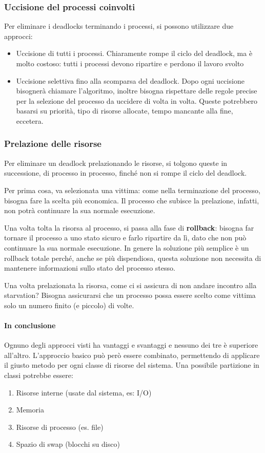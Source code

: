 \documentclass[a4paper]{article}
\begin{document}
\subsubsection{Uccisione del processi coinvolti}
Per eliminare i deadlocks terminando i processi, si possono utilizzare due approcci:
\begin{itemize}
    \item Uccisione di tutti i processi. Chiaramente rompe il ciclo del deadlock, ma è molto costoso: tutti i processi devono ripartire e perdono il lavoro svolto
    \item Uccisione selettiva fino alla scomparsa del deadlock. Dopo ogni uccisione bisognerà chiamare l'algoritmo, inoltre bisogna rispettare delle regole precise per la selezione del processo da uccidere di volta in volta. Queste potrebbero basarsi su priorità, tipo di risorse allocate, tempo mancante  alla fine, eccetera.
\end{itemize}

\subsubsection{Prelazione delle risorse}
Per eliminare un deadlock prelazionando le risorse, si tolgono queste in successione, di processo in processo, finché non si rompe il ciclo del deadlock.

Per prima cosa, va selezionata una vittima: come nella terminazione del processo, bisogna fare la scelta più economica. Il processo che subisce la prelazione, infatti, non potrà continuare la sua normale esecuzione.

Una volta tolta la risorsa al processo, si passa alla fase di \textbf{rollback}: bisogna far tornare il processo a uno stato sicuro e farlo ripartire da lì, dato che non può continuare la sua normale esecuzione. In genere la soluzione più semplice è un rollback totale perché, anche se più dispendiosa, questa soluzione non necessita di mantenere informazioni sullo stato del processo stesso.

Una volta prelazionata la risorsa, come ci si assicura di non andare incontro alla starvation? Bisogna assicurarsi che un processo possa essere scelto come vittima solo un numero finito (e piccolo) di volte.

\paragraph{In conclusione} Ognuno degli approcci visti ha vantaggi e svantaggi e nessuno dei tre è superiore all'altro. L'approccio basico può però essere combinato, permettendo di applicare il giusto metodo per ogni classe di risorse del sistema. Una possibile partizione in classi potrebbe essere:
\begin{enumerate}
    \item Risorse interne (usate dal sistema, es: I/O)
    \item Memoria
    \item Risorse di processo (es. file)
    \item Spazio di swap (blocchi su disco)
\end{enumerate}
\end{document}
